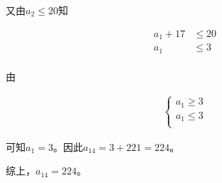 又由$a_2 \le 20$知

\begin{align*}
  a_1 + 17 &\le 20 \\
  a_1 &\le 3 \\
\end{align*}

由

\begin{align*}
  \begin{cases}
    a_1 \ge 3 \\
    a_1 \le 3 \\
  \end{cases}
\end{align*}

可知$a_1 = 3$。因此$a_{14} = 3 + 221 = 224$。

综上，$a_{14} = 224$。
